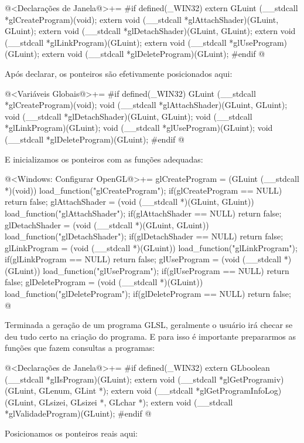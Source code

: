 \iniciocodigo
@<Declarações de Janela@>+=
#if defined(_WIN32)
extern GLuint (__stdcall *glCreateProgram)(void);
extern void (__stdcall *glAttachShader)(GLuint, GLuint);
extern void (__stdcall *glDetachShader)(GLuint, GLuint);
extern void (__stdcall *glLinkProgram)(GLuint);
extern void (__stdcall *glUseProgram)(GLuint);
extern void (__stdcall *glDeleteProgram)(GLuint);
#endif
@
\fimcodigo

Após declarar, os ponteiros são efetivamente posicionados aqui:

\iniciocodigo
@<Variáveis Globais@>+=
#if defined(_WIN32)
GLuint (__stdcall *glCreateProgram)(void);
void (__stdcall *glAttachShader)(GLuint, GLuint);
void (__stdcall *glDetachShader)(GLuint, GLuint);
void (__stdcall *glLinkProgram)(GLuint);
void (__stdcall *glUseProgram)(GLuint);
void (__stdcall *glDeleteProgram)(GLuint);
#endif
@
\fimcodigo

E inicializamos os ponteiros com as funções adequadas:

\iniciocodigo
@<Windows: Configurar OpenGL@>+=
glCreateProgram = (GLuint (__stdcall *)(void)) load_function("glCreateProgram");
if(glCreateProgram == NULL) return false;
glAttachShader = (void (__stdcall *)(GLuint, GLuint))
                  load_function("glAttachShader");
if(glAttachShader == NULL) return false;
glDetachShader = (void (__stdcall *)(GLuint, GLuint))
                 load_function("glDetachShader");
if(glDetachShader == NULL) return false;
glLinkProgram = (void (__stdcall *)(GLuint)) load_function("glLinkProgram");
if(glLinkProgram == NULL) return false;
glUseProgram = (void (__stdcall *)(GLuint)) load_function("glUseProgram");
if(glUseProgram == NULL) return false;
glDeleteProgram = (void (__stdcall *)(GLuint)) load_function("glDeleteProgram");
if(glDeleteProgram == NULL) return false;
@
\fimcodigo

Terminada a geração de um programa GLSL, geralmente o usuário irá
checar se deu tudo certo na criação do programa. E para isso é
importante prepararmos as funções que fazem consultas a programas:

\iniciocodigo
@<Declarações de Janela@>+=
#if defined(_WIN32)
extern GLboolean (__stdcall *glIsProgram)(GLuint);
extern void (__stdcall *glGetProgramiv)(GLuint, GLenum, GLint *);
extern void (__stdcall *glGetProgramInfoLog)(GLuint, GLsizei, GLsizei *,
                                             GLchar *);
extern void (__stdcall *glValidadeProgram)(GLuint);
#endif
@
\fimcodigo

Posicionamos os ponteiros reais aqui:

